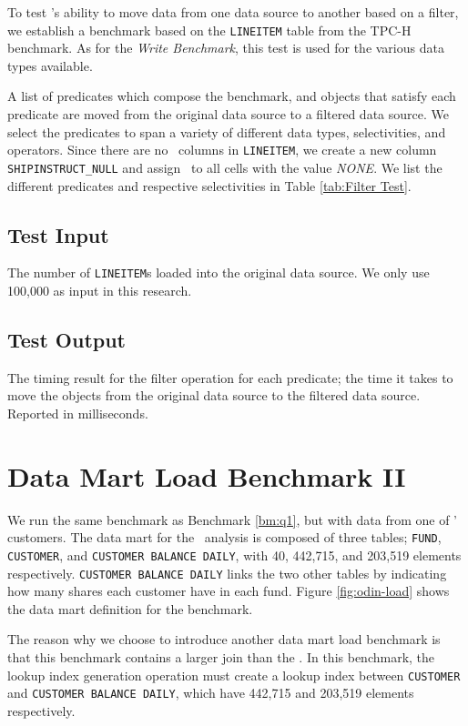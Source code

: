 To test \gap's ability to move data from one data source to another based on a filter, we establish a benchmark based on the \texttt{LINEITEM} table from the TPC-H benchmark. As for the \textit{Write Benchmark}, this test is used for the various data types available.

A list of predicates which compose the benchmark, and objects that satisfy each predicate are moved from the original data source to a filtered data source. We select the predicates to span a variety of different data types, selectivities, and operators. Since there are no \null~columns in \texttt{LINEITEM}, we create a new column \texttt{SHIPINSTRUCT\_NULL} and assign \null~to all cells with the value \textit{NONE}. We list the different predicates and respective selectivities in Table \ref{tab:Filter Test}.

\subsection{Test Input}
\label{sub:Test Input}
The number of \texttt{LINEITEM}s loaded into the original data source. We only use 100,000 as input in this research.

\subsection{Test Output}
\label{sub:Test Output}
The timing result for the filter operation for each predicate; the time it takes to move the objects from the original data source to the filtered data source. Reported in milliseconds.

\section{Data Mart Load Benchmark II}
\label{bm:odin-load}


We run the same benchmark as Benchmark \ref{bm:q1}, but with data from one of \genus' customers. The data mart for the \gd~analysis is composed of three tables; \texttt{FUND}, \texttt{CUSTOMER}, and \texttt{CUSTOMER BALANCE DAILY}, with 40, 442,715, and 203,519 elements respectively. \texttt{CUSTOMER BALANCE DAILY} links the two other tables by indicating how many shares each customer have in each fund. Figure \ref{fig:odin-load} shows the data mart definition for the benchmark.

The reason why we choose to introduce another data mart load benchmark is that this benchmark contains a larger join than the \tpchdl. In this benchmark, the lookup index generation operation must create a lookup index between \texttt{CUSTOMER} and \texttt{CUSTOMER BALANCE DAILY}, which have 442,715 and 203,519 elements respectively.

